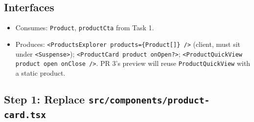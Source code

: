 \documentclass[11pt,a4paper]{article}
\begin{document}
\subsection*{Interfaces}
\begin{itemize}
  \item Consumes: \texttt{Product}, \texttt{productCta} from Task 1.
  \item Produces: \lstinline!<ProductsExplorer products={Product[]} />! (client, must sit under
        \lstinline!<Suspense>!); \lstinline!<ProductCard product onOpen?>!;
        \lstinline!<ProductQuickView product open onClose />!. PR 3's preview will reuse
        \texttt{ProductQuickView} with a static product.
\end{itemize}

\subsection*{Step 1: Replace \texttt{src/components/product-card.tsx}}
\end{document}
